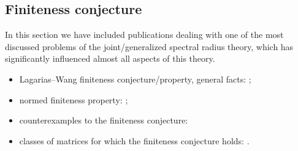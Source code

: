 \subsection*{Finiteness conjecture}

In this section we have included publications dealing with one of the most discussed problems of the joint/generalized spectral radius theory, which has significantly influenced almost all aspects of this theory.
\begin{itemize}
\item Lagarias--Wang finiteness conjecture/property, general facts: \cite{BTV:MTNS02, Charina:ACHA13, DHX:PAMS13, GugZen:LAA12, JenPoll:ETDS17, Koz:LAA16, Koz:WSDV16, LagWang:LAA95, Maesumi:TIC95, Morris:LAA10};
\item normed finiteness property: \cite{LiShih:LAA08};
\item counterexamples to the finiteness conjecture: \cite{BochiMor:PLMS15, BM:JAMS02, BTV:SIAMJMA03, CJ:IJAMCS07, HMST:AdvMath11, JenPoll:ETDS17, JP:SIAMJMA09, Koz:CDC05:e, Koz:WIAS05, Koz:INFOPROC06:e}
\item classes of matrices for which the finiteness conjecture holds: \cite{AhmJun14, AhmJng:NAHS16, Charina:ACHA13, CGSZ:LAA10, CiconePhD11, Dai:ArXiv11, Dai:LAA13, DHX:ArXiv13-1, DHX:PAMS13, DK:INFOPROC11:e, JB:LAA08, JM:LAA13, Koz:LAA16, LiuXiao:LNCS12, Morris:LAA10, Morris:ArXiv11, PanScl:Nonlin21, WangWen:CIS13}.
\end{itemize}

